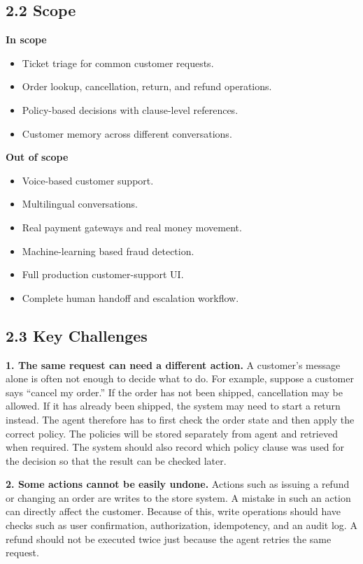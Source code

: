 \documentclass[11pt,a4paper]{article}
\begin{document}
\subsection*{2.2 Scope}

\textbf{In scope}
\begin{itemize}
    \item Ticket triage for common customer requests.
    \item Order lookup, cancellation, return, and refund operations.
    \item Policy-based decisions with clause-level references.
    \item Customer memory across different conversations.
\end{itemize}

\textbf{Out of scope}
\begin{itemize}
    \item Voice-based customer support.
    \item Multilingual conversations.
    \item Real payment gateways and real money movement.
    \item Machine-learning based fraud detection.
    \item Full production customer-support UI.
    \item Complete human handoff and escalation workflow.
\end{itemize}

\subsection*{2.3 Key Challenges}

\textbf{1. The same request can need a different action.}
A customer's message alone is often not enough to decide what to do. For example, suppose a customer says ``cancel my order.'' If the order has not been shipped, cancellation may be allowed. If it has already been shipped, the system may need to start a return instead. The agent therefore has to first check the order state and then apply the correct policy. The policies will be stored separately from agent and retrieved when required. The system should also record which policy clause was used for the decision so that the result can be checked later.

\textbf{2. Some actions cannot be easily undone.}
Actions such as issuing a refund or changing an order are writes to the store system. A mistake in such an action can directly affect the customer. Because of this, write operations should have checks such as user confirmation, authorization, idempotency, and an audit log. A refund should not be executed twice just because the agent retries the same request.
\end{document}
